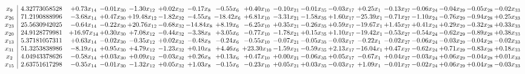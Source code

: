 \documentclass[9pt]{article}
\begin{document}
 \[\begin{array}{c| c c@{\hskip 2pt} c@{\hskip 2pt} c@{\hskip 2pt} c@{\hskip 2pt} c@{\hskip 2pt} c@{\hskip 2pt} c@{\hskip 2pt} c@{\hskip 2pt} c@{\hskip 2pt} c@{\hskip 2pt} c@{\hskip 2pt} c@{\hskip 2pt} c@{\hskip 2pt} c@{\hskip 2pt} c@{\hskip 2pt} c@{\hskip 2pt} }
 x_{9}   &  4.32773058528 & +  0.73 x_{14} & -0.01 x_{30} & -1.30 x_{12} & +  0.02 x_{32} & -0.17 x_{8} & -0.55 x_{6} & +  0.40 x_{10} & -0.10 x_{21} & -0.01 x_{35} & -0.03 x_{17} & +  0.25 x_{1} & -0.13 x_{27} & -0.06 x_{24} & -0.04 x_{29} & -0.05 x_{28} & -0.02 x_{33}\\
 x_{26}   &  71.2190888996 & -3.68 x_{14} & +  0.47 x_{30} & + 19.48 x_{12} & -1.82 x_{32} & -4.55 x_{8} & -18.42 x_{6} & +  6.81 x_{10} & -3.31 x_{21} & -1.58 x_{35} & +  1.60 x_{17} & -25.39 x_{1} & -0.71 x_{27} & -1.10 x_{24} & -0.76 x_{29} & -0.94 x_{28} & +  0.25 x_{33}\\
 x_{23}   &  25.5630942025 & -0.64 x_{14} & -0.22 x_{30} & + 20.76 x_{12} & -0.68 x_{32} & -14.84 x_{8} & +  8.19 x_{6} & -6.25 x_{10} & +  0.35 x_{21} & -0.26 x_{35} & +  0.59 x_{17} & -19.67 x_{1} & +  1.45 x_{27} & +  0.41 x_{24} & +  0.29 x_{29} & -0.32 x_{28} & +  0.33 x_{33}\\
 x_{20}   &  24.9128779981 & + 16.97 x_{14} & +  0.30 x_{30} & +  7.08 x_{12} & -0.44 x_{32} & -3.38 x_{8} & +  3.05 x_{6} & -0.77 x_{10} & -1.78 x_{21} & +  0.15 x_{35} & +  1.10 x_{17} & -19.42 x_{1} & -0.53 x_{27} & -0.54 x_{24} & -0.62 x_{29} & -0.89 x_{28} & +  0.38 x_{33}\\
 x_{13}   &  5.37181057311 & +  0.63 x_{14} & -0.02 x_{30} & -0.35 x_{12} & +  0.02 x_{32} & -0.48 x_{8} & -0.24 x_{6} & -0.55 x_{10} & -0.07 x_{21} & -0.05 x_{35} & -0.03 x_{17} & -0.22 x_{1} & -0.02 x_{27} & -0.06 x_{24} & -0.03 x_{29} & -0.04 x_{28} & -0.02 x_{33}\\
 x_{31}   &  51.3253838986 & -8.19 x_{14} & +  0.95 x_{30} & +  4.79 x_{12} & -1.23 x_{32} & +  0.10 x_{8} & +  4.46 x_{6} & + 23.30 x_{10} & -1.59 x_{21} & -0.59 x_{35} & +  2.13 x_{17} & -16.04 x_{1} & +  0.47 x_{27} & -0.62 x_{24} & +  0.71 x_{29} & -0.83 x_{28} & +  0.18 x_{33}\\
 x_{2}   &  4.04943378626 & -0.58 x_{14} & +  0.03 x_{30} & +  0.09 x_{12} & -0.03 x_{32} & +  0.26 x_{8} & +  0.13 x_{6} & +  0.47 x_{10} & +  0.00 x_{21} & -0.06 x_{35} & +  0.05 x_{17} & -0.67 x_{1} & +  0.04 x_{27} & -0.03 x_{24} & +  0.06 x_{29} & -0.04 x_{28} & +  0.01 x_{33}\\
 x_{15}   &  2.63751617298 & -0.35 x_{14} & -0.01 x_{30} & -1.32 x_{12} & +  0.05 x_{32} & +  1.03 x_{8} & -0.15 x_{6} & -0.23 x_{10} & +  0.05 x_{21} & +  0.03 x_{35} & -0.03 x_{17} & +  1.09 x_{1} & -0.01 x_{27} & -0.02 x_{24} & +  0.06 x_{29} & +  0.04 x_{28} & -0.03 x_{33}\\

\end{array}\]
\end{document}

